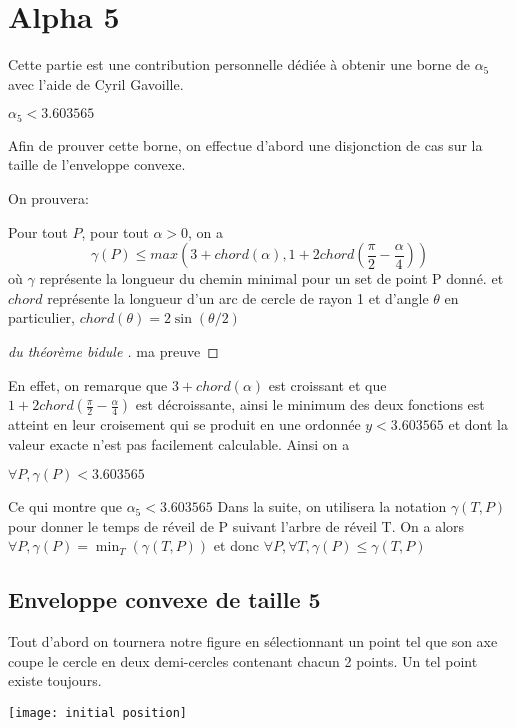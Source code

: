 \section{Alpha 5}

Cette partie est une contribution personnelle dédiée à obtenir une borne de $\alpha_5$ avec l'aide de Cyril Gavoille.

\(\alpha_5 < 3.603565\)

Afin de prouver cette borne, on effectue d'abord une disjonction de cas sur la taille de l'enveloppe convexe.

On prouvera:

\begin{lemma}\label{chord}
Pour tout $P$, pour tout $\alpha >0$, on a
$$\gamma(P) \leq max(3 + chord(\alpha), 1 + 2chord(\frac{\pi}{2} - \frac{\alpha}{4})) $$
où $\gamma$ représente la longueur du chemin minimal pour un set de point P donné. et $chord$ représente la longueur d'un arc de cercle de rayon 1 et d'angle $\theta$ en particulier, $chord(\theta) = 2\sin(\theta/2)$
\end{lemma}

\begin{proof}[du théorème bidule ]
ma preuve
\end{proof}

En effet, on remarque que $3+chord(\alpha)$ est croissant et que $1 + 2chord(\frac{\pi}{2} - \frac{\alpha}{4})$ est décroissante, ainsi le minimum des deux fonctions est atteint en leur croisement qui se produit en une ordonnée $y < 3.603565$ et dont la valeur exacte n'est pas facilement calculable. Ainsi on a

\(\forall P, \gamma(P) < 3.603565\)

Ce qui montre que $\alpha_5 < 3.603565$
\newline
\newline
Dans la suite, on utilisera la notation $\gamma(T, P)$ pour donner le temps de réveil de P suivant l'arbre de réveil T.
On a alors $\forall P, \gamma(P) = \min_T(\gamma(T,P))$
et donc $\forall P, \forall T, \gamma(P) \leq \gamma(T, P)$
\subsection{Enveloppe convexe de taille 5}

Tout d'abord on tournera notre figure en sélectionnant un point tel que son axe coupe le cercle en deux demi-cercles contenant chacun 2 points. Un tel point existe toujours.

\texttt{[image: initial position]}

